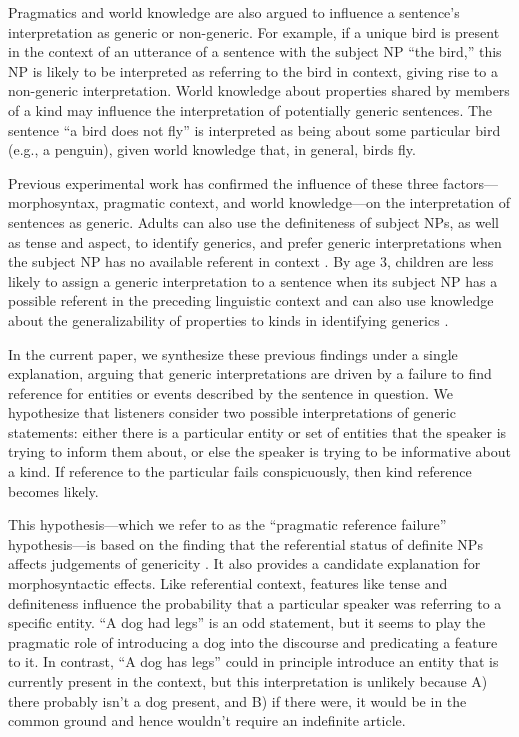 \documentclass[10pt,letterpaper]{article}
\begin{document}
Pragmatics and world knowledge are also argued to influence a sentence's interpretation as generic or non-generic. For example, if a unique bird is present in the context of an utterance of a sentence with the subject NP ``the bird,'' this NP is likely to be interpreted as referring to the bird in context, giving rise to a non-generic interpretation. World knowledge about properties shared by members of a kind may influence the interpretation of potentially generic sentences. The sentence ``a bird does not fly'' is interpreted as being about some particular bird (e.g., a penguin), given world knowledge that, in general, birds fly.

Previous experimental work has confirmed the influence of these three factors---morphosyntax, pragmatic context, and world knowledge---on the interpretation of sentences as generic. Adults can also use the definiteness of subject NPs, as well as tense and aspect, to identify generics, and prefer generic interpretations when the subject NP has no available referent in context \cite{Gelman:2003,Cimpian:2011}. By age 3, children are less likely to assign a generic interpretation to a sentence when its subject NP has a possible referent in the preceding linguistic context and can also use knowledge about the generalizability of properties to kinds in identifying generics \cite{Cimpian:2008}.


In the current paper, we synthesize these previous findings under a single explanation, arguing that generic interpretations are driven by a failure to find reference for entities or events described by the sentence in question. We hypothesize that listeners consider two possible interpretations of generic statements: either there is a particular entity or set of entities that the speaker is trying to inform them about, or else the speaker is trying to be informative about a kind. If reference to the particular fails conspicuously, then kind reference becomes likely.

This hypothesis---which we refer to as the ``pragmatic reference failure'' hypothesis---is based on the finding that the referential status of definite NPs affects judgements of genericity \cite{Gelman:2003}. It also provides a candidate explanation for morphosyntactic effects. Like referential context, features like tense and definiteness influence the probability that a particular speaker was referring to a specific entity. ``A dog had legs'' is an odd statement, but it seems to play the pragmatic role of introducing a dog into the discourse and predicating a feature to it. In contrast, ``A dog has legs'' could in principle introduce an entity that is currently present in the context, but this interpretation is unlikely because A) there probably isn't a dog present, and B) if there were, it would be in the common ground and hence wouldn't require an indefinite article.
\end{document}
